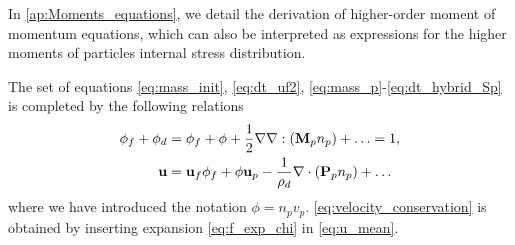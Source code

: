 In \ref{ap:Moments_equations}, we detail the derivation of higher-order moment of momentum equations, which can also be interpreted as expressions for the higher moments of particles internal stress distribution. 

The set of equations \ref{eq:mass_init}, \ref{eq:dt_uf2}, \ref{eq:mass_p}-\ref{eq:dt_hybrid_Sp} is completed by the following relations %
\begin{align}
    \phi_f + \phi_d &= 
    \phi_f + \phi  + \frac{1}{2}\grad\grad : (\textbf{M}_p n_p) + \ldots = 1,
    \label{eq:volume_conservation}\\
    \textbf{u} &= \textbf{u}_f\phi_f + 
    \phi\textbf{u}_p - \frac{1}{\rho_d} \div  (\textbf{P}_p n_p) + \ldots
    \label{eq:velocity_conservation}
\end{align}
where we have introduced the notation $\phi = n_pv_p$. 
\ref{eq:velocity_conservation} is obtained by inserting expansion \ref{eq:f_exp_chi} in \ref{eq:u_mean}.

